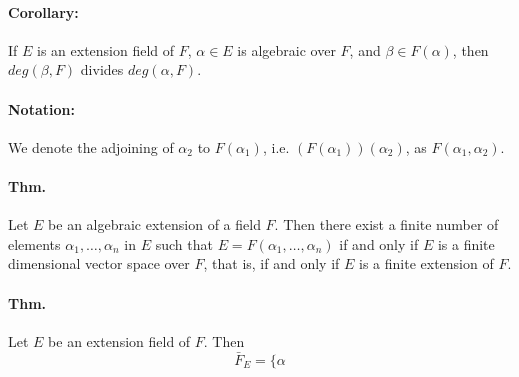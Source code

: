 \documentclass[10pt,a4paper]{article}
\begin{document}
\paragraph{Corollary:} If $E$ is an extension field of $F$, $\alpha \in E$ is algebraic over $F$, and $\beta \in F(\alpha)$, then $deg(\beta, F)$ divides $deg(\alpha, F)$.

\paragraph{Notation:} We denote the adjoining of $\alpha_2$ to $F(\alpha_1)$, i.e. $(F(\alpha_1))(\alpha_2)$, as $F(\alpha_1, \alpha_2)$.

\paragraph{Thm.} Let $E$ be an algebraic extension of a field $F$. Then there exist a finite number of elements $\alpha_1, \dots, \alpha_n$ in $E$ such that $E = F(\alpha_1, \dots, \alpha_n)$ if and only if $E$ is a finite dimensional vector space over $F$, that is, if and only if $E$ is a finite extension of $F$.

\paragraph{Thm.} Let $E$ be an extension field of $F$. Then 
$$ \bar{F}_E = \{ \alpha$$
\end{document}
